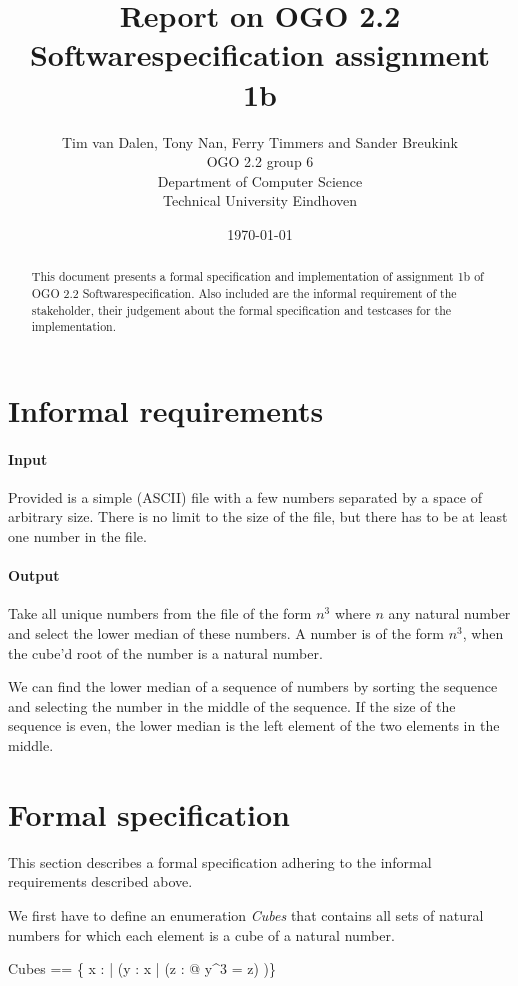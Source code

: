 \documentclass[12pt]{article}
\title{Report on OGO 2.2 Softwarespecification assignment 1b}
\author{
        Tim van Dalen, Tony Nan, Ferry Timmers and Sander Breukink\\ OGO 2.2 group 6 \\
                Department of Computer Science\\
        Technical University Eindhoven\\
}
\date{\today}
\begin{document}
\maketitle

\begin{abstract}
This document presents a formal specification and implementation of assignment 1b of OGO 2.2 Softwarespecification. Also included are the informal requirement of the stakeholder, their judgement about the formal specification and testcases for the implementation.
\end{abstract}

\section{Informal requirements}
\paragraph{Input} Provided is a simple (ASCII) file with a few numbers separated by a space of arbitrary size. There is no limit to the size of the file, but there has to be at least one number in the file.

\paragraph{Output} Take all unique numbers from the file of the form $n^3$ where $n$ any natural number and select the lower median of these numbers. A number is of the form $n^3$, when the cube'd root of the number is a natural number.

We can find the lower median of a sequence of numbers by sorting the sequence and selecting the number in the middle of the sequence. If the size of the sequence is even, the lower median is the left element of the two elements in the middle.

\section{Formal specification}

This section describes a formal specification adhering to the informal requirements described above.

We first have to define an enumeration \textit{Cubes} that contains all sets of natural numbers for which each element is a cube of a natural number.
\begin{axdef}
Cubes == \{ x : \power \nat | (\forall y : x | (\exists z : \nat @ y^3 = z) )\}
\end{axdef}
\end{document}
